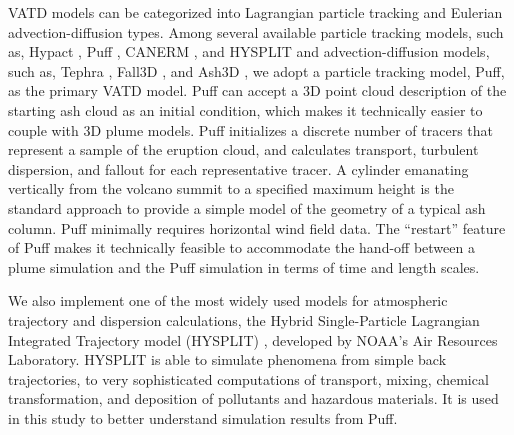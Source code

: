 \documentclass[utf8]{frontiersSCNS} %
\begin{document}
VATD models can be categorized into Lagrangian particle tracking and Eulerian advection-diffusion types. Among several available particle tracking models, such as, Hypact \citep{walko1995hypact}, Puff \citep{searcy1998puff}, CANERM \citep{d1998modeling}, and HYSPLIT \citep{draxler1998overview} and advection-diffusion models, such as,  Tephra \citep{bonadonna2005total}, Fall3D \citep{folch2009fall3d}, and Ash3D \citep{schwaiger2012ash3d}, we adopt a particle tracking model, Puff, as the primary VATD model. Puff can accept a 3D point cloud description of the starting ash cloud as an initial condition, which makes it technically easier to couple with 3D plume models. Puff initializes a discrete number of tracers that represent a sample of the eruption cloud, and calculates transport, turbulent dispersion, and fallout for each representative tracer. A cylinder emanating vertically from the volcano summit to a specified maximum height is the standard approach to provide a simple model of the geometry of a typical ash column. Puff minimally requires horizontal wind field data. The ``restart'' feature of Puff makes it technically feasible to accommodate the hand-off between a plume simulation and the Puff simulation in terms of time and length scales.

We also implement one of the most widely used models for atmospheric trajectory and dispersion calculations, the Hybrid Single-Particle Lagrangian Integrated Trajectory model (HYSPLIT) \citep{stein2015noaa, rolph2017real}, developed by NOAA's Air Resources Laboratory. HYSPLIT is able to simulate phenomena from simple back trajectories, to very sophisticated computations of transport, mixing, chemical transformation, and deposition of pollutants and hazardous materials. It  is used in this study to better understand simulation results from Puff.
\end{document}
